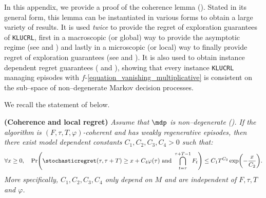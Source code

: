 \documentclass[preprint,cleveref,12pt]{colt2025}
\DeclarePairedDelimiter{\parens}{(}{)}	%
\def\model{\mdp}
\begin{document}
    In this appendix, we provide a proof of the coherence lemma ().
    Stated in its general form, this lemma can be instantiated in various forms to obtain a large variety of results. 
    It is used \emph{twice} to provide the regret of exploration guarantees of \texttt{KLUCRL}, first in a macroscopic (or global) way to provide the asymptotic regime (see  and ) and lastly in a microscopic (or local) way to finally provide regret of exploration guarantees (see  and ).
    It is also used to obtain instance dependent regret guarantees ( and ), showing that every instance \texttt{KLUCRL} managing episodes with $f$-\eqref{equation_vanishing_multiplicative} is consistent on the sub--space of non--degenerate Markov decision processes. 

    We recall the statement of  below.

    \par
    \bigskip
    \noindent
    \textbf{ (Coherence and local regret)}
    \textit{
        Assume that $\model$ is non--degenerate ().
        If the algorithm is $(F, \tau, T, \varphi)$-coherent and has weakly regenerative episodes, then there exist model dependent constants $C_1, C_2, C_3, C_4 > 0$ such that: 
        \begin{equation*}
            \forall x \ge 0,
            \quad
            \Pr \parens*{
                \stochasticregret(\tau, \tau + T) 
                \ge 
                x + C_4 \varphi(\tau)
                \text{~and~}
                \bigcap_{t=\tau}^{\tau+T-1} F_t
            }
            \le
            C_1 T^{C_3}
            \exp\parens*{
                - \frac x{C_2}
            }
            .
        \end{equation*}
        More specifically, $C_1, C_2, C_3, C_4$ only depend on $M$ and are independent of $F, \tau, T$ and $\varphi$.
    }
\end{document}
